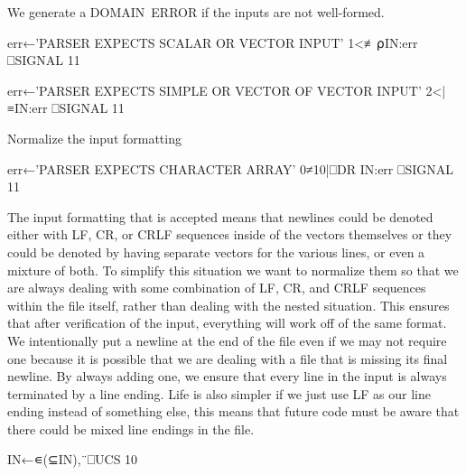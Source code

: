 \documentclass{article}%
\begin{document}
\noindent
We generate a {\Tt{}DOMAIN\ ERROR\nwendquote} if the inputs are not well-formed.

\nwenddocs{}\endmoddef\nwstartdeflinemarkup{}\nwenddeflinemarkup
err←'PARSER EXPECTS SCALAR OR VECTOR INPUT'
1<≢⍴IN:err ⎕SIGNAL 11

err←'PARSER EXPECTS SIMPLE OR VECTOR OF VECTOR INPUT'
2<|≡IN:err ⎕SIGNAL 11

\LA{}Normalize the input formatting~{\nwtagstyle{}}\RA{}

err←'PARSER EXPECTS CHARACTER ARRAY'
0≠10|⎕DR IN:err ⎕SIGNAL 11
\nwendcode{}\nwdocspar

The input formatting that is accepted means that newlines could be
denoted either with {\Tt{}LF\nwendquote}, {\Tt{}CR\nwendquote}, or {\Tt{}CRLF\nwendquote}
sequences inside of the vectors
themselves or they could be denoted by having separate vectors
for the various lines,
or even a mixture of both.
To simplify this situation we want to normalize them so that we are
always dealing with some combination of {\Tt{}LF\nwendquote}, {\Tt{}CR\nwendquote}, and {\Tt{}CRLF\nwendquote}
sequences
within the file itself, rather than dealing with the nested
situation.
This ensures that after verification of the input,
everything will work off of the same format.
We intentionally put a newline at the end of the file even if we
may not require one because it is possible that we are dealing
with a file that is missing its final newline.
By always adding one, we ensure that every line in the input
is always terminated by a line ending.
Life is also simpler if we just use LF as our line ending instead
of something else,
this means that future code must be aware that there could be mixed
line endings in the file.

\nwenddocs{}\endmoddef\nwstartdeflinemarkup{}\nwenddeflinemarkup
IN←∊(⊆IN),¨⎕UCS 10
\nwendcode{}\nwdocspar
\end{document}
